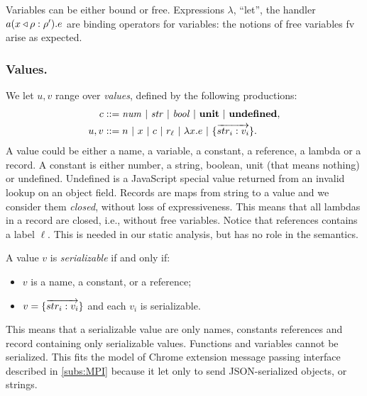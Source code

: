 Variables can be either bound or free. Expressions  $\lambda$, ``let'', the handler $\handler{a}{x}{\rho}{e}{\rho'}$ are binding operators for variables: the notions of free variables fv arise as expected.

\subsubsection{Values.}
We let $u,v$ range over \emph{values}, defined by the following productions:
\begin{align*}
c & ::= \mathit{num} ~|~ \mathit{str} ~|~ \mathit{bool} ~|~ \unit ~|~ \undef, \\
u,v &::= n ~|~ x ~|~ c ~|~ r_{\ell} ~|~ \lam{x}{e} ~|~ \rec{\vec{str_i:v_i}}.
\end{align*}
A value could be either a name, a variable, a constant, a reference, a lambda or a record. A constant is either number, a string, boolean, unit (that means nothing) or undefined. Undefined is a JavaScript special value returned from an invalid lookup on an object field. Records are maps from string to a value and we consider them \emph{closed}, without loss of expressiveness. This means that all lambdas in a record are closed, i.e., without free variables. Notice that references contains a label $\ell$. This is needed in our static analysis, but has no role in the semantics.

\begin{definition}
\label{def:serializable}
A value $v$ is \emph{serializable} if and only if:
\begin{itemize}
\item $v$ is a name, a constant, or a reference;
\item $v = \rec{\vec{str_i:v_i}}$ and each $v_i$ is serializable.
\end{itemize}
\end{definition}
This means that a serializable value are only names, constants references and record containing only serializable values. Functions and variables cannot be serialized. This fits the model of Chrome extension message passing interface described in \ref{subs:MPI} because it let only to send JSON-serialized objects, or strings.

